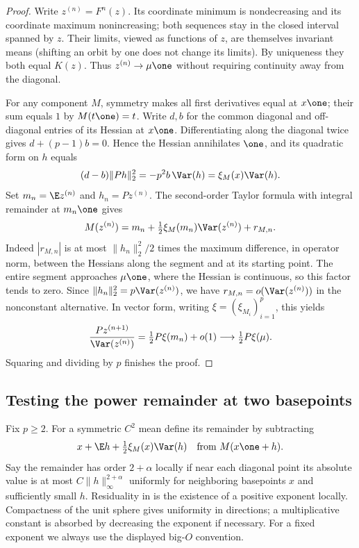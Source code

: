 \documentclass[11pt,a4paper]{article}
\numberwithin{equation}{section}
\theoremstyle{definition}
\theoremstyle{remark}
\begin{document}
\begin{proof}
Write $z^{(n)}=F^n(z)$. Its coordinate minimum is nondecreasing and its coordinate maximum nonincreasing; both sequences stay in the closed interval spanned by $z$. Their limits, viewed as functions of $z$, are themselves invariant means (shifting an orbit by one does not change its limits). By uniqueness they both equal $K(z)$. Thus $z^{(n)}\to\mu\one$ without requiring continuity away from the diagonal.

For any component $M$, symmetry makes all first derivatives equal at $x\one$; their sum equals $1$ by $M(t\one)=t$. Write $d,b$ for the common diagonal and off-diagonal entries of its Hessian at $x\one$. Differentiating along the diagonal twice gives $d+(p-1)b=0$. Hence the Hessian annihilates $\one$, and its quadratic form on $h$ equals
\[
 (d-b)\|Ph\|_2^2 = -p^2 b\,\Var(h)=\xi_M(x)\Var(h).
\]
Set $m_n=\E z^{(n)}$ and $h_n=Pz^{(n)}$. The second-order Taylor formula with integral remainder at $m_n\one$ gives
\[
 M(z^{(n)})=m_n+\tfrac12\xi_M(m_n)\Var(z^{(n)})+r_{M,n}.
\]
Indeed $|r_{M,n}|$ is at most $\|h_n\|_2^2/2$ times the maximum difference, in operator norm, between the Hessians along the segment and at its starting point. The entire segment approaches $\mu\one$, where the Hessian is continuous, so this factor tends to zero. Since $\|h_n\|_2^2=p\Var(z^{(n)})$, we have $r_{M,n}=o(\Var(z^{(n)}))$ in the nonconstant alternative. In vector form, writing $\xi=(\xi_{M_i})_{i=1}^p$, this yields
\[
 \frac{Pz^{(n+1)}}{\Var(z^{(n)})}=\tfrac12 P\xi(m_n)+o(1)
 \longrightarrow\tfrac12 P\xi(\mu).
\]
Squaring and dividing by $p$ finishes the proof.
\end{proof}
\subsection{Testing the power remainder at two basepoints}
Fix $p\ge2$. For a symmetric $C^2$ mean define its remainder by subtracting
\[
 x+\E h+\tfrac12\xi_M(x)\Var(h)\quad\text{from }M(x\one+h).
\]
Say the remainder has order $2+\alpha$ locally if near each diagonal point its absolute value is at most $C\|h\|_\infty^{2+\alpha}$ uniformly for neighboring basepoints $x$ and sufficiently small $h$. Residuality in \cite{r28showa:p} is the existence of a positive exponent locally. Compactness of the unit sphere gives uniformity in directions; a multiplicative constant is absorbed by decreasing the exponent if necessary. For a fixed exponent we always use the displayed big-$O$ convention.
\end{document}
